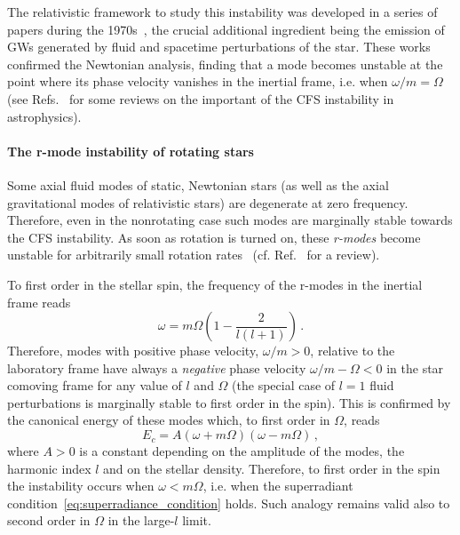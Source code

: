 \documentclass[11pt]{article}
\numberwithin{equation}{section} %
\begin{document}
The relativistic framework to study this instability was developed in a series of papers during the 
1970s~\cite{1975ApJ...200..204F,Friedman:1978hf,1978ApJ...221..937F}, the crucial additional ingredient being the 
emission of GWs generated by fluid and spacetime perturbations of the star. These works confirmed the Newtonian 
analysis, finding that a mode becomes unstable at the point where its phase velocity vanishes in the inertial frame, 
i.e. when $\omega/m=\Omega$ (see Refs.~\cite{Stergioulas:2003yp,Andersson:2006nr} for some reviews on the important of 
the CFS instability in astrophysics). 


\paragraph{The r-mode instability of rotating stars}
Some axial fluid modes of static, Newtonian stars (as well as the axial gravitational modes of relativistic stars) are 
degenerate at zero frequency. Therefore,  even in the nonrotating case such modes are marginally stable towards the CFS 
instability. As soon as rotation is turned on, these \emph{r-modes} become unstable for arbitrarily small rotation 
rates~\cite{Andersson:1997xt} (cf. Ref.~\cite{Andersson:2000mf} for a review).

To first order in the stellar spin, the frequency of the r-modes in the inertial frame reads
%
\begin{equation}
 \omega=m\Omega\left(1-\frac{2}{l(l+1)}\right)\,.
\end{equation}
%
Therefore, modes with positive phase velocity, $\omega/m>0$, relative to the laboratory frame have always a 
\emph{negative} phase velocity $\omega/m-\Omega<0$ in the star comoving frame for any value of $l$ and $\Omega$ (the 
special case of $l=1$ fluid perturbations is marginally stable to first order in the spin). This is confirmed by the 
canonical energy of these modes which, to first order in $\Omega$, reads~\cite{Andersson:2006nr}
\begin{equation}
 E_c=A(\omega+m\Omega)(\omega-m\Omega)\,,
\end{equation}
where $A>0$ is a constant depending on the amplitude of the modes, the harmonic index $l$ and on the stellar density. 
Therefore, to first order in the spin the instability occurs when $\omega<m\Omega$, i.e. when the superradiant 
condition~\eqref{eq:superradiance_condition} holds. Such analogy remains valid also to second order in $\Omega$ in the 
large-$l$ limit.
\end{document}
